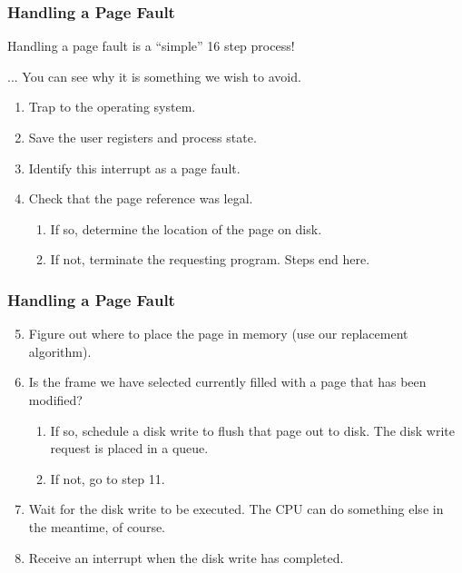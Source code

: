 \begin{frame}
\frametitle{Handling a Page Fault}

Handling a page fault is a ``simple'' 16 step process!

... You can see why it is something we wish to avoid.

\begin{enumerate}
	\item Trap to the operating system.
	\item Save the user registers and process state.
	\item Identify this interrupt as a page fault.
	\item Check that the page reference was legal. 
	\begin{enumerate}
		\item If so, determine the location of the page on disk.
		\item If not, terminate the requesting program. Steps end here.
	\end{enumerate}
	\setcounter{pf}{\theenumi}
\end{enumerate}

\end{frame}

\begin{frame}
\frametitle{Handling a Page Fault}
\begin{enumerate}
	\setcounter{enumi}{4}
	\item Figure out where to place the page in memory (use our replacement algorithm).
	\item Is the frame we have selected currently filled with a page that has been modified? 
	\begin{enumerate}
		\item If so, schedule a disk write to flush that page out to disk. The disk write request is placed in a queue.
		\item If not, go to step 11.
	\end{enumerate} 
	\item Wait for the disk write to be executed. The CPU can do something else in the meantime, of course.
	\item Receive an interrupt when the disk write has completed.
\end{enumerate}

\end{frame}

